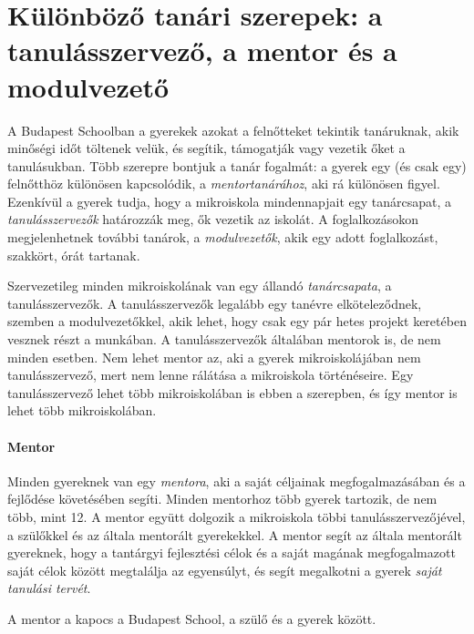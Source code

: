 \section{Különböző tanári szerepek: a tanulásszervező, a mentor és a
    modulvezető}
\label{sec:tanarok}

A Budapest Schoolban a gyerekek azokat a felnőtteket tekintik tanáruknak, akik
minőségi időt töltenek velük, és segítik, támogatják vagy vezetik őket a
tanulásukban. Több szerepre bontjuk a tanár fogalmát: a gyerek egy (és csak
egy) felnőtthöz különösen kapcsolódik, a \emph{mentortanárához}, aki rá
különösen figyel. Ezenkívül a gyerek tudja, hogy a mikroiskola mindennapjait
egy tanárcsapat, a \emph{tanulásszervezők} határozzák meg, ők vezetik az
iskolát.  A foglalkozásokon megjelenhetnek további tanárok, a \emph{modulvezetők},
akik egy adott foglalkozást, szakkört, órát tartanak.

Szervezetileg minden mikroiskolának van egy állandó \emph{tanárcsapata}, a
tanulásszervezők. A tanulásszervezők legalább egy tanévre elköteleződnek, szemben a
modulvezetőkkel, akik lehet, hogy csak egy pár hetes projekt keretében vesznek részt a
munkában.
A tanulásszervezők általában mentorok is, de nem minden esetben. Nem lehet
mentor az, aki a gyerek mikroiskolájában nem tanulásszervező, mert nem lenne
rálátása a mikroiskola történéseire. Egy tanulásszervező lehet több
mikroiskolában is ebben a szerepben, és így mentor is lehet több mikroiskolában.

\paragraph{Mentor}
Minden gyereknek van egy \emph{mentora}, aki a saját céljainak
megfogalmazásában és
a fejlődése követésében segíti. Minden mentorhoz több gyerek tartozik, de nem
több, mint 12. A mentor együtt dolgozik a mikroiskola többi tanulásszervezőjével, a
szülőkkel és az általa mentorált gyerekekkel. A mentor segít az általa
mentorált gyereknek, hogy a tantárgyi fejlesztési célok és
a
saját magának megfogalmazott saját célok között megtalálja  az egyensúlyt, és segít megalkotni a
gyerek \emph{saját
  tanulási tervét}.

A mentor a kapocs a Budapest School, a szülő és a gyerek között.

